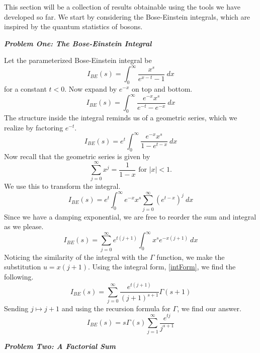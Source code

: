 This section will be a collection of results obtainable using the tools we have developed so far.
We start by considering the Bose-Einstein integrals, which are inspired by the quantum statistics of bosons.

\begin{center}
\textit{\textbf{Problem One: The Bose-Einstein Integral}}
\end{center}

Let the parameterized Bose-Einstein integral be
$$I_{BE} (s) = \int_{0}^\infty \frac{x^s}{e^{x-t} - 1} \ dx$$
for a constant $t < 0$. 
Now expand by $e^{-x}$ on top and bottom.
$$I_{BE} (s) = \int_{0}^\infty \frac{e^{-x} x^s}{e^{-t} - e^{-x}} \ dx$$
The structure inside the integral reminds us of a geometric series, which we realize by factoring $e^{-t}$.
$$I_{BE} (s) = e^{t} \int_0^\infty \frac{e^{-x} x^s}{1 - e^{t-x}} \ dx$$
Now recall that the geometric series is given by 
$$\sum_{j=0}^\infty x^j = \frac{1}{1 - x} \text{ for } |x| < 1.$$
We use this to transform the integral.
$$I_{BE} (s) = e^{t} \int_{0}^\infty e^{-x} x^s \sum_{j=0}^\infty (e^{t-x})^j \ dx$$
Since we have a damping exponential, we are free to reorder the sum and integral as we please.
$$I_{BE} (s) = \sum_{j=0}^\infty e^{t(j+1)} \int_{0}^\infty x^s e^{-x(j+1)} \ dx$$
Noticing the similarity of the integral with the $\Gamma$ function, we make the substitution $u = x (j+1)$.
Using the integral form, \eqref{intForm}, we find the following.
$$I_{BE} (s) = \sum_{j=0}^\infty \frac{e^{t(j+1)}}{(j+1)^{s+1}} \Gamma(s+1)$$
Sending $j \mapsto j+1$ and using the recursion formula for $\Gamma$, we find our answer.
$$\boxed{I_{BE} (s) = s\Gamma(s) \sum_{j=1}^\infty \frac{e^{tj}}{j^{s+1}}}$$

\begin{center}
\textit{\textbf{Problem Two: A Factorial Sum}}
\end{center}

